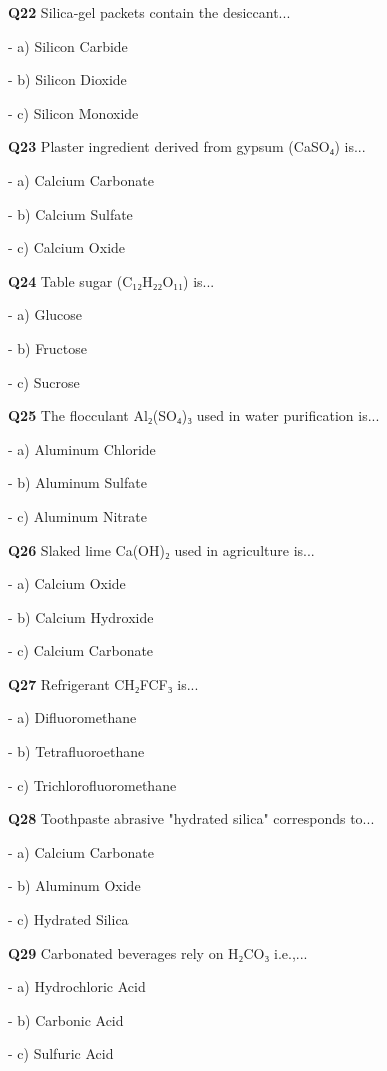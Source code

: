 \textbf{Q22} Silica‑gel packets contain the desiccant...\par
\quad - a) Silicon Carbide\par
\quad - b) Silicon Dioxide\par
\quad - c) Silicon Monoxide\par

\textbf{Q23} Plaster ingredient derived from gypsum (CaSO₄) is...\par
\quad - a) Calcium Carbonate\par
\quad - b) Calcium Sulfate\par
\quad - c) Calcium Oxide\par

\textbf{Q24} Table sugar (C₁₂H₂₂O₁₁) is...\par
\quad - a) Glucose\par
\quad - b) Fructose\par
\quad - c) Sucrose\par

\textbf{Q25} The flocculant Al₂(SO₄)₃ used in water purification is...\par
\quad - a) Aluminum Chloride\par
\quad - b) Aluminum Sulfate\par
\quad - c) Aluminum Nitrate\par

\textbf{Q26} Slaked lime Ca(OH)₂ used in agriculture is...\par
\quad - a) Calcium Oxide\par
\quad - b) Calcium Hydroxide\par
\quad - c) Calcium Carbonate\par

\textbf{Q27} Refrigerant CH₂FCF₃ is...\par
\quad - a) Difluoromethane\par
\quad - b) Tetrafluoroethane\par
\quad - c) Trichlorofluoromethane\par

\textbf{Q28} Toothpaste abrasive "hydrated silica" corresponds to...\par
\quad - a) Calcium Carbonate\par
\quad - b) Aluminum Oxide\par
\quad - c) Hydrated Silica\par

\textbf{Q29} Carbonated beverages rely on H₂CO₃ i.e.,...\par
\quad - a) Hydrochloric Acid\par
\quad - b) Carbonic Acid\par
\quad - c) Sulfuric Acid\par

